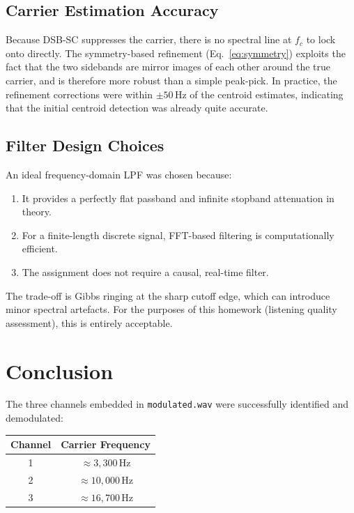 \documentclass[12pt, a4paper]{article}
\begin{document}
\subsection{Carrier Estimation Accuracy}

Because DSB-SC suppresses the carrier, there is no spectral line at $f_c$ to
lock onto directly. The symmetry-based refinement (Eq.~\ref{eq:symmetry})
exploits the fact that the two sidebands are mirror images of each other
around the true carrier, and is therefore more robust than a simple peak-pick.
In practice, the refinement corrections were within $\pm 50\,\text{Hz}$ of the
centroid estimates, indicating that the initial centroid detection was already
quite accurate.

\subsection{Filter Design Choices}

An ideal frequency-domain LPF was chosen because:
\begin{enumerate}[nosep]
    \item It provides a perfectly flat passband and infinite stopband
          attenuation in theory.
    \item For a finite-length discrete signal, FFT-based filtering is
          computationally efficient.
    \item The assignment does not require a causal, real-time filter.
\end{enumerate}

The trade-off is Gibbs ringing at the sharp cutoff edge, which can introduce
minor spectral artefacts. For the purposes of this homework (listening quality
assessment), this is entirely acceptable.

\section{Conclusion}

The three channels embedded in \texttt{modulated.wav} were successfully
identified and demodulated:

\begin{center}
\renewcommand{\arraystretch}{1.3}
\begin{tabular}{cc}
    \toprule
    \textbf{Channel} & \textbf{Carrier Frequency} \\
    \midrule
    1 & $\approx 3{,}300\,\text{Hz}$ \\
    2 & $\approx 10{,}000\,\text{Hz}$ \\
    3 & $\approx 16{,}700\,\text{Hz}$ \\
    \bottomrule
\end{tabular}
\end{center}
\end{document}
